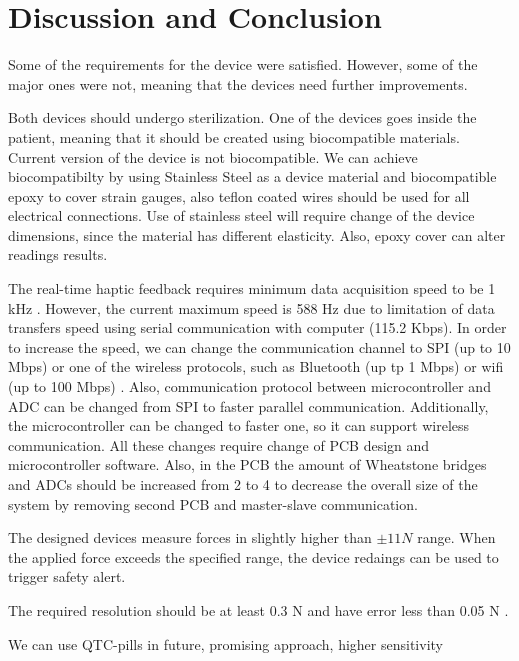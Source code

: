 \chapter{Discussion and Conclusion}
\label{discuss} %

Some of the requirements for the device were satisfied. However, some of the major ones were not, meaning that the devices need further improvements.
	
	Both devices should undergo sterilization. One of the devices goes inside the patient, meaning that it should be created using biocompatible materials. Current version of the device is not biocompatible. We can achieve biocompatibilty by using Stainless Steel as a device material and biocompatible epoxy to cover strain gauges, also teflon coated wires should be used for all electrical connections. Use of stainless steel will require change of the device dimensions, since the material has different elasticity. Also, epoxy cover can alter readings results.
	
	The real-time haptic feedback requires minimum data acquisition speed to be 1 kHz \cite{seungmoon_choi_effect_2004}. However, the current maximum speed is 588 Hz due to limitation of data transfers speed using serial communication with computer (115.2 Kbps). In order to increase the speed, we can change the communication channel to SPI (up to 10 Mbps) \cite{_uart_porotocol} or one of the wireless protocols, such as Bluetooth (up tp 1 Mbps) or wifi (up to 100 Mbps) \cite{_wireless_protocols}. Also, communication protocol between microcontroller and ADC can be changed from SPI to faster parallel communication. Additionally, the microcontroller can be changed to faster one, so it can support wireless communication.
	All these changes require change of PCB design and microcontroller software. Also, in the PCB the amount of Wheatstone bridges and ADCs should be increased from 2 to 4 to decrease the overall size of the system by removing second PCB and master-slave communication.
	
	The designed devices measure forces in slightly higher than $\pm 11 N$ range. When the applied force exceeds the specified range, the device redaings can be used to trigger safety alert.
	
	The required resolution should be at least 0.3 N and have error less than 0.05 N \cite{mack_interactive_2012}.
	

We can use QTC-pills in future, promising approach, higher sensitivity 
	
